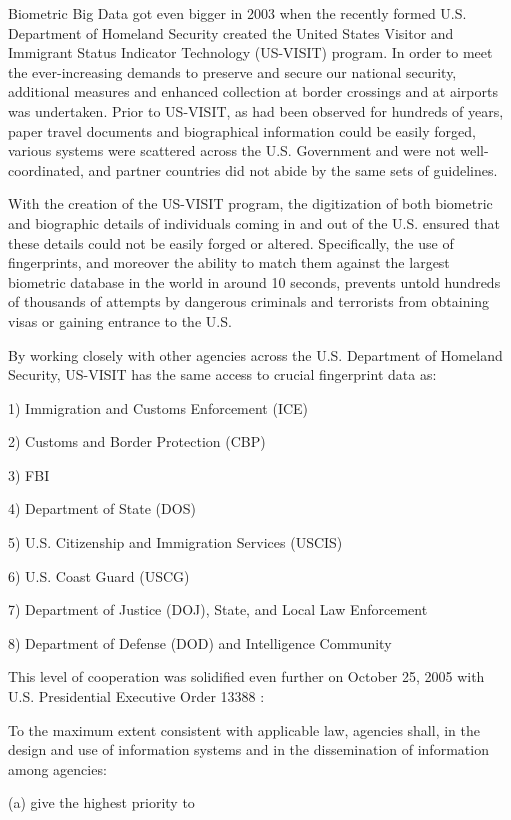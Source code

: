 \documentclass[sigconf]{acmart}
\begin{document}
Biometric Big Data got even bigger in 2003 when the recently formed U.S. Department of Homeland Security created the United States Visitor and Immigrant Status Indicator Technology (US-VISIT) program. In order to meet the ever-increasing demands to preserve and secure our national security, additional measures and enhanced collection at border crossings and at airports was undertaken. Prior to US-VISIT, as had been observed for hundreds of years, paper travel documents and biographical information could be easily forged, various systems were scattered across the U.S. Government and were not well-coordinated, and partner countries did not abide by the same sets of guidelines. 

With the creation of the US-VISIT program, the digitization of both biometric and biographic details of individuals coming in and out of the U.S. ensured that these details could not be easily forged or altered. Specifically, the use of fingerprints, and moreover the ability to match them against the largest biometric database in the world in around 10 seconds, prevents untold hundreds of thousands of attempts by dangerous criminals and terrorists from obtaining visas or gaining entrance to the U.S. 

By working closely with other agencies across the U.S. Department of Homeland Security, US-VISIT has the same access to crucial fingerprint data as: 

1) Immigration and Customs Enforcement (ICE)

2) Customs and Border Protection (CBP) 

3) FBI 

4) Department of State (DOS)

5) U.S. Citizenship and Immigration Services (USCIS)

6) U.S. Coast Guard (USCG)

7) Department of Justice (DOJ), State, and Local Law Enforcement

8) Department of Defense (DOD) and Intelligence Community\break

This level of cooperation was solidified even further on October 25, 2005 with U.S. Presidential Executive Order 13388 \cite{ISE2017}:\break 

    To the maximum extent consistent with applicable law, agencies shall, in the design and use of information systems and in the dissemination of information among agencies: 

    (a) give the highest priority to 
\end{document}
